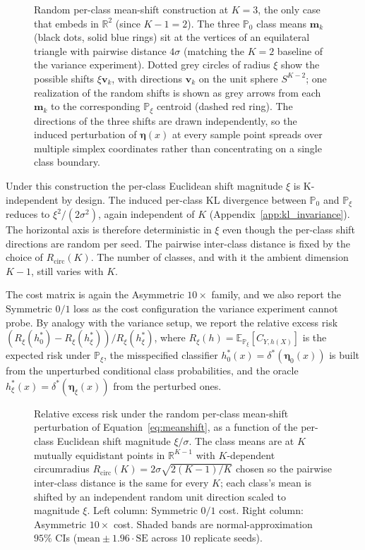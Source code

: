 \begin{figure}[H]
    \centering
    
    \caption{Random per-class mean-shift construction at $K = 3$, the only case that embeds in $\mathbb{R}^2$ (since $K-1 = 2$). The three $\mathbb{P}_0$ class means $\mathbf{m}_k$ (black dots, solid blue rings) sit at the vertices of an equilateral triangle with pairwise distance $4\sigma$ (matching the $K=2$ baseline of the variance experiment). Dotted grey circles of radius $\xi$ show the possible shifts $\xi\mathbf{v}_k$, with directions $\mathbf{v}_k$ on the unit sphere $S^{K-2}$; one realization of the random shifts is shown as grey arrows from each $\mathbf{m}_k$ to the corresponding $\mathbb{P}_\xi$ centroid (dashed red ring). The directions of the three shifts are drawn independently, so the induced perturbation of $\boldsymbol{\eta}(x)$ at every sample point spreads over multiple simplex coordinates rather than concentrating on a single class boundary.}%
    \label{fig:misspec-sensitivity-meanshift-setup}
\end{figure}

Under this construction the per-class Euclidean shift magnitude $\xi$ is K-independent by design. The induced per-class KL divergence between $\mathbb{P}_0$ and $\mathbb{P}_\xi$ reduces to $\xi^2/(2\sigma^2)$, again independent of $K$ (Appendix~\ref{app:kl_invariance}). The horizontal axis is therefore deterministic in $\xi$ even though the per-class shift directions are random per seed. The pairwise inter-class distance is fixed by the choice of $R_{\mathrm{circ}}(K)$. The number of classes, and with it the ambient dimension $K-1$, still varies with $K$.

The cost matrix is again the Asymmetric $10\times$ family, and we also report the Symmetric $0/1$ loss as the cost configuration the variance experiment cannot probe. By analogy with the variance setup, we report the relative excess risk $(R_\xi(h^*_0) - R_\xi(h^*_\xi))/R_\xi(h^*_\xi)$, where $R_\xi(h) = \mathbb{E}_{\mathbb{P}_\xi}[C_{Y, h(X)}]$ is the expected risk under $\mathbb{P}_\xi$, the misspecified classifier $h^*_0(x) = \delta^*(\boldsymbol{\eta}_0(x))$ is built from the unperturbed conditional class probabilities, and the oracle $h^*_\xi(x) = \delta^*(\boldsymbol{\eta}_\xi(x))$ from the perturbed ones.

\begin{figure}[H]
    \centering
    
    \caption{Relative excess risk under the random per-class mean-shift perturbation of Equation~\eqref{eq:meanshift}, as a function of the per-class Euclidean shift magnitude $\xi/\sigma$. The class means are at $K$ mutually equidistant points in $\mathbb{R}^{K-1}$ with $K$-dependent circumradius $R_{\mathrm{circ}}(K) = 2\sigma\sqrt{2(K-1)/K}$ chosen so the pairwise inter-class distance is the same for every $K$; each class's mean is shifted by an independent random unit direction scaled to magnitude $\xi$. Left column: Symmetric $0/1$ cost. Right column: Asymmetric $10\times$ cost. Shaded bands are normal-approximation $95\%$ CIs ($\mathrm{mean} \pm 1.96 \cdot \mathrm{SE}$ across $10$ replicate seeds).}%
    \label{fig:misspec-sensitivity-meanshift}
\end{figure}

